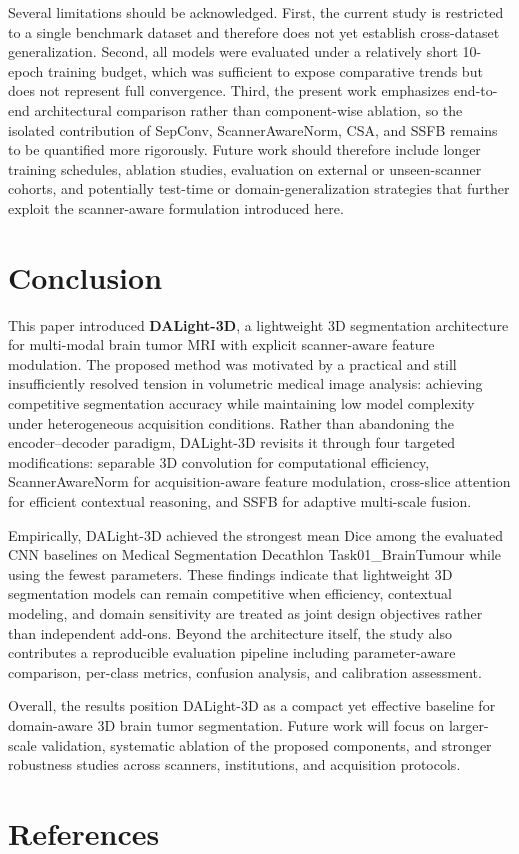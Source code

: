\documentclass[conference]{IEEEtran}
\begin{document}
Several limitations should be acknowledged. First, the current study is restricted to a single benchmark dataset and therefore does not yet establish cross-dataset generalization. Second, all models were evaluated under a relatively short 10-epoch training budget, which was sufficient to expose comparative trends but does not represent full convergence. Third, the present work emphasizes end-to-end architectural comparison rather than component-wise ablation, so the isolated contribution of SepConv, ScannerAwareNorm, CSA, and SSFB remains to be quantified more rigorously. Future work should therefore include longer training schedules, ablation studies, evaluation on external or unseen-scanner cohorts, and potentially test-time or domain-generalization strategies that further exploit the scanner-aware formulation introduced here.

\section{Conclusion}
\label{sec:conclusion}

This paper introduced \textbf{DALight-3D}, a lightweight 3D segmentation architecture for multi-modal brain tumor MRI with explicit scanner-aware feature modulation. The proposed method was motivated by a practical and still insufficiently resolved tension in volumetric medical image analysis: achieving competitive segmentation accuracy while maintaining low model complexity under heterogeneous acquisition conditions. Rather than abandoning the encoder--decoder paradigm, DALight-3D revisits it through four targeted modifications: separable 3D convolution for computational efficiency, ScannerAwareNorm for acquisition-aware feature modulation, cross-slice attention for efficient contextual reasoning, and SSFB for adaptive multi-scale fusion.

Empirically, DALight-3D achieved the strongest mean Dice among the evaluated CNN baselines on Medical Segmentation Decathlon Task01\_BrainTumour while using the fewest parameters. These findings indicate that lightweight 3D segmentation models can remain competitive when efficiency, contextual modeling, and domain sensitivity are treated as joint design objectives rather than independent add-ons. Beyond the architecture itself, the study also contributes a reproducible evaluation pipeline including parameter-aware comparison, per-class metrics, confusion analysis, and calibration assessment.

Overall, the results position DALight-3D as a compact yet effective baseline for domain-aware 3D brain tumor segmentation. Future work will focus on larger-scale validation, systematic ablation of the proposed components, and stronger robustness studies across scanners, institutions, and acquisition protocols.

\section*{References}


\end{document}
